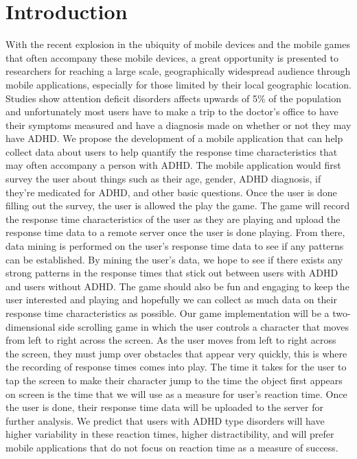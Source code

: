 \documentclass[a4wide]{article}
\begin{document}
\section{Introduction}
\- With the recent explosion in the ubiquity of mobile devices and the mobile games that often accompany these mobile devices, a great opportunity is presented to researchers for reaching a large scale, geographically widespread audience through mobile applications, especially for those limited by their local geographic location. Studies show attention deficit disorders affects upwards of 5\% of the population and unfortunately most users have to make a trip to the doctor's office to have their symptoms measured and have a diagnosis made on whether or not they may have ADHD.
\newline
\newline
\- We propose the development of a mobile application that can help collect data about users to help quantify the response time characteristics that may often accompany a person with ADHD. The mobile application would first survey the user about things such as their age, gender, ADHD diagnosis, if they're medicated for ADHD, and other basic questions. Once the user is done filling out the survey, the user is allowed the play the game. The game will record the response time characteristics of the user as they are playing and upload the response time data to a remote server once the user is done playing. From there, data mining is performed on the user's response time data to see if any patterns can be established.  By mining the user's data, we hope to see if there exists any strong patterns in the response times that stick out between users with ADHD and users without ADHD. The game should also be fun and engaging to keep the user interested and playing and hopefully we can collect as much data on their response time characteristics as possible.
\newline
\newline
\- Our game implementation will be a two-dimensional side scrolling game in which the user controls a character that moves from left to right across the screen. As the user moves from left to right across the screen, they must jump over obstacles that appear very quickly, this is where the recording of response times comes into play. The time it takes for the user to tap the screen to make their character jump to the time the object first appears on screen is the time that we will use as a measure for user's reaction time. Once the user is done, their response time data will be uploaded to the server for further analysis. We predict that users with ADHD type disorders will have higher variability in these reaction times, higher distractibility, and will prefer mobile applications that do not focus on reaction time as a measure of success.
\end{document}
